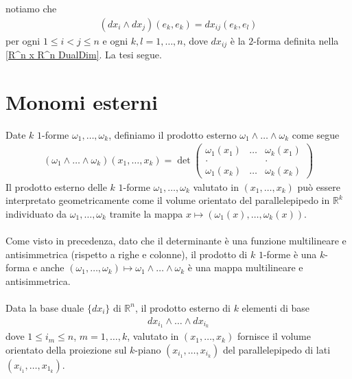 \documentclass[twoside, 11pt]{amsbook}
\makeatletter
\newcommand{\0}{{(0)}}
\newcommand{\3}{{(3)}}
\theoremstyle{colonplain}
\theoremstyle{colondefinition}
\theoremstyle{colonremark}
\numberwithin{equation}{chapter}
\renewcommand{\proofname}{Dimostrazione}
\renewenvironment{proof}[1][\proofname]{\par
  \pushQED{\qed}%
  \normalfont \topsep6\p@\@plus6\p@\relax
  \trivlist
  \item[\hskip\labelsep\bfseries #1:]\ignorespaces
}{%
  \popQED\endtrivlist\@endpefalse
}
\makeatother
\begin{document}
\begin{proof} notiamo che 
\begin{align}
    (dx_i \wedge dx_j)(e_k, e_k) = dx_{ij}(e_k, e_l) 
\end{align}
per ogni $1 \leq i < j \leq n$ e ogni $k, l = 1, \dots, n$, dove $dx_{ij}$ è la $2$-forma definita nella \ref{R^n x R^n DualDim}. La tesi segue. \end{proof}

\section{Monomi esterni}
Date $k$ $1$-forme $\omega_1, \dots, \omega_k$, definiamo il prodotto esterno $\omega_1 \wedge \dots \wedge \omega_k$ come segue
\begin{align}
    (\omega_1 \wedge \dots \wedge \omega_k)(x_1, \dots, x_k) = \det
    \begin{pmatrix}
        \omega_1(x_1) & \dots & \omega_k(x_1) \\
        . & & . \\
        \omega_1(x_k) & \dots & \omega_k(x_k)
    \end{pmatrix} 
\end{align}
Il prodotto esterno delle $k$ $1$-forme $\omega_1, \dots, \omega_k$ valutato in $(x_1, \dots, x_k)$ può essere interpretato geometricamente come il volume orientato del parallelepipedo in $\mathbb{R}^k$ individuato da $\omega_1, \dots, \omega_k$ tramite la mappa $x \mapsto (\omega_1(x), \dots, \omega_k(x))$. \\ \\
Come visto in precedenza, dato che il determinante è una funzione multilineare e antisimmetrica (rispetto a righe e colonne), il prodotto di $k$ $1$-forme è una $k$-forma e anche $(\omega_1, \dots, \omega_k) \mapsto \omega_1 \wedge \dots \wedge \omega_k$ è una mappa multilineare e antisimmetrica. \\ \\
Data la base duale $\{dx_i\}$ di $\mathbb{R}^n$, il prodotto esterno di $k$ elementi di base 
\begin{align}
    dx_{i_1} \wedge \dots \wedge dx_{i_k} 
\end{align}
dove $1 \leq i_m \leq n$, $m = 1, \dots, k$,  valutato in $(x_1, \dots, x_k)$ fornisce il volume orientato della proiezione sul $k$-piano $(x_{i_1}, \dots, x_{i_k})$ del parallelepipedo di lati $(x_{i_1}, \dots, x_{1_k})$. \\ \\
\end{document}
